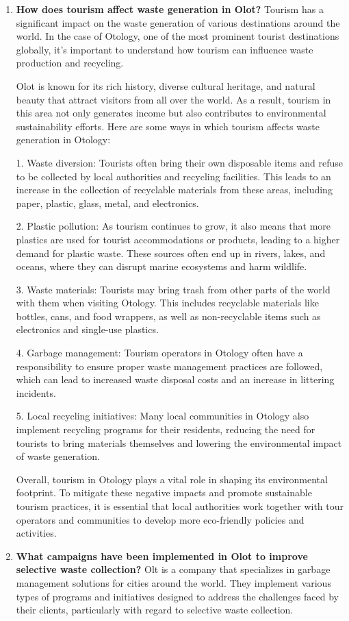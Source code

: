 \begin{enumerate}
For example:
- If it's a general truck manufacturing company
- If it has specific maintenance and repair services

If no particular company is identified, I can't say for certain which one.
\item \textbf{How does tourism affect waste generation in Olot?}
Tourism has a significant impact on the waste generation of various destinations around the world. In the case of Otology, one of the most prominent tourist destinations globally, it's important to understand how tourism can influence waste production and recycling.

Olot is known for its rich history, diverse cultural heritage, and natural beauty that attract visitors from all over the world. As a result, tourism in this area not only generates income but also contributes to environmental sustainability efforts. Here are some ways in which tourism affects waste generation in Otology:

1. Waste diversion: Tourists often bring their own disposable items and refuse to be collected by local authorities and recycling facilities. This leads to an increase in the collection of recyclable materials from these areas, including paper, plastic, glass, metal, and electronics.

2. Plastic pollution: As tourism continues to grow, it also means that more plastics are used for tourist accommodations or products, leading to a higher demand for plastic waste. These sources often end up in rivers, lakes, and oceans, where they can disrupt marine ecosystems and harm wildlife.

3. Waste materials: Tourists may bring trash from other parts of the world with them when visiting Otology. This includes recyclable materials like bottles, cans, and food wrappers, as well as non-recyclable items such as electronics and single-use plastics.

4. Garbage management: Tourism operators in Otology often have a responsibility to ensure proper waste management practices are followed, which can lead to increased waste disposal costs and an increase in littering incidents.

5. Local recycling initiatives: Many local communities in Otology also implement recycling programs for their residents, reducing the need for tourists to bring materials themselves and lowering the environmental impact of waste generation.

Overall, tourism in Otology plays a vital role in shaping its environmental footprint. To mitigate these negative impacts and promote sustainable tourism practices, it is essential that local authorities work together with tour operators and communities to develop more eco-friendly policies and activities.
\item \textbf{What campaigns have been implemented in Olot to improve selective waste collection?}
Olt is a company that specializes in garbage management solutions for cities around the world. They implement various types of programs and initiatives designed to address the challenges faced by their clients, particularly with regard to selective waste collection.


\end{enumerate}
